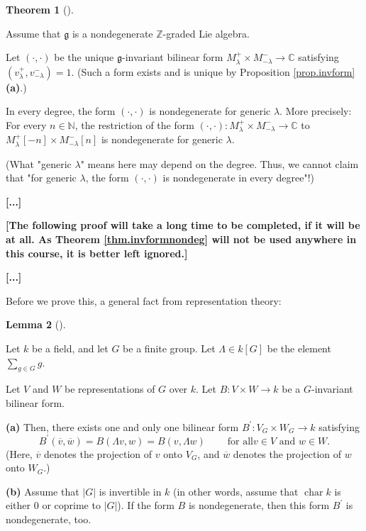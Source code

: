 \documentclass
[numbers=enddot,12pt,final,onecolumn,german,notitlepage]{scrartcl}%
\theoremstyle{definition}
\newtheorem{theo}{Theorem}
\newenvironment{theorem}[1][]
{\begin{theo}[#1]\begin{leftbar}}
{\end{leftbar}\end{theo}}
\newtheorem{lem}[theo]{Lemma}
\newenvironment{lemma}[1][]
{\begin{lem}[#1]\begin{leftbar}}
{\end{leftbar}\end{lem}}
\begin{document}
\begin{theorem}
\label{thm.invformnondeg}Assume that $\mathfrak{g}$ is a nondegenerate
$\mathbb{Z}$-graded Lie algebra.

Let $\left(  \cdot,\cdot\right)  $ be the unique $\mathfrak{g}$-invariant
bilinear form $M_{\lambda}^{+}\times M_{-\lambda}^{-}\rightarrow\mathbb{C}$
satisfying $\left(  v_{\lambda}^{+},v_{-\lambda}^{-}\right)  =1$. (Such a form
exists and is unique by Proposition \ref{prop.invform} \textbf{(a)}.)

In every degree, the form $\left(  \cdot,\cdot\right)  $ is nondegenerate for
generic $\lambda$. More precisely: For every $n\in\mathbb{N}$, the restriction
of the form $\left(  \cdot,\cdot\right)  :M_{\lambda}^{+}\times M_{-\lambda
}^{-}\rightarrow\mathbb{C}$ to $M_{\lambda}^{+}\left[  -n\right]  \times
M_{-\lambda}^{-}\left[  n\right]  $ is nondegenerate for generic $\lambda$.

(What "generic $\lambda$" means here may depend on the degree. Thus, we cannot
claim that "for generic $\lambda$, the form $\left(  \cdot,\cdot\right)  $ is
nondegenerate in every degree"!)
\end{theorem}

\textbf{[...]}

\textbf{[The following proof will take a long time to be completed, if it will
be at all. As Theorem \ref{thm.invformnondeg} will not be used anywhere in
this course, it is better left ignored.]}

\textbf{[...]}

Before we prove this, a general fact from representation theory:

\begin{lemma}
\label{lem.bilform}Let $k$ be a field, and let $G$ be a finite group. Let
$\Lambda\in k\left[  G\right]  $ be the element $\sum\limits_{g\in G}g$.

Let $V$ and $W$ be representations of $G$ over $k$. Let $B:V\times
W\rightarrow k$ be a $G$-invariant bilinear form.

\textbf{(a)} Then, there exists one and only one bilinear form $B^{\prime
}:V_{G}\times W_{G}\rightarrow k$ satisfying%
\[
B^{\prime}\left(  \overline{v},\overline{w}\right)  =B\left(  \Lambda
v,w\right)  =B\left(  v,\Lambda w\right)  \ \ \ \ \ \ \ \ \ \ \text{for all
}v\in V\text{ and }w\in W\text{.}%
\]
(Here, $\overline{v}$ denotes the projection of $v$ onto $V_{G}$, and
$\overline{w}$ denotes the projection of $w$ onto $W_{G}$.)

\textbf{(b)} Assume that $\left\vert G\right\vert $ is invertible in $k$ (in
other words, assume that $\operatorname*{char}k$ is either $0$ or coprime to
$\left\vert G\right\vert $). If the form $B$ is nondegenerate, then this form
$B^{\prime}$ is nondegenerate, too.
\end{lemma}
\end{document}
